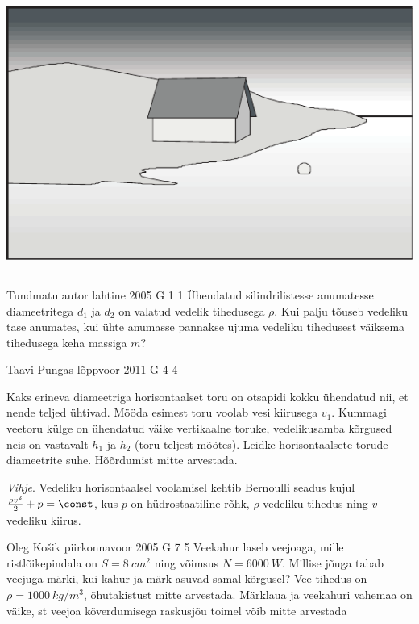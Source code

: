 \documentclass[11pt]{article}
\begin{document}
{{\begin{center}
	\includegraphics[width=0.9\linewidth]{2008-lahg-09-yl}
\end{center}
\fi
}
\newpage\subsection{\protect{}}

{Tundmatu autor} %
{lahtine} %
{2005} %
{G 1} %
{1} %
{
\ifStatement
Ühendatud silindrilistesse anumatesse diameetritega $d_1$ ja $d_2$ on valatud vedelik tihedusega $\rho$. Kui palju tõuseb vedeliku tase anumates, kui ühte anumasse pannakse ujuma vedeliku tihedusest väiksema tihedusega keha massiga $m$?
\fi
}

{Taavi Pungas} %
{lõppvoor} %
{2011} %
{G 4} %
{4} %
{
\ifStatement
Kaks erineva diameetriga horisontaalset toru on otsapidi
kokku ühendatud nii, et nende teljed ühtivad. Mööda esimest toru voolab vesi
kiirusega $v_1$. Kummagi veetoru külge on ühendatud väike vertikaalne toruke,
vedelikusamba kõrgused neis on vastavalt $h_1$ ja $h_2$ (toru teljest mõõtes). Leidke
horisontaalsete torude diameetrite suhe. Hõõrdumist mitte arvestada. 

\emph{Vihje}. 
Vedeliku horisontaalsel voolamisel kehtib Bernoulli seadus kujul $\frac{\rho v^2}{2}+p=\const$, kus $p$ on hüdrostaatiline rõhk, $ρ$ vedeliku tihedus ning $v$ vedeliku kiirus.
\fi
}

{Oleg Košik} %
{piirkonnavoor} %
{2005} %
{G 7} %
{5} %
{
\ifStatement
Veekahur laseb veejoaga, mille ristlõikepindala on $S = \SI{8}{cm^2}$ ning võimsus $N = \SI{6000}{W}$. Millise jõuga tabab veejuga märki, kui kahur ja märk asuvad samal kõrgusel? Vee tihedus on $\rho = \SI{1000}{kg/m^3}$, õhutakistust mitte arvestada. Märklaua ja veekahuri vahemaa on väike, st veejoa kõverdumisega raskusjõu toimel võib mitte arvestada
\fi
}

}
\end{document}
